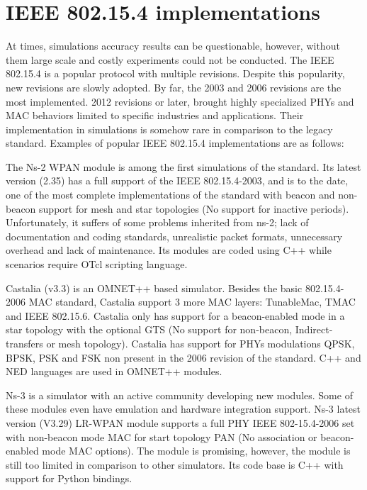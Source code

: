 \documentclass[conference]{IEEEtran}
\begin{document}
\section{IEEE 802.15.4 implementations} \label{implementationStd}
At times, simulations accuracy results can be questionable, however, without them large scale and costly experiments could not be conducted. The IEEE 802.15.4 is a popular protocol with multiple revisions. Despite this popularity, new revisions are slowly adopted. By far, the 2003 and 2006 revisions are the most implemented. 2012 revisions or later, brought highly specialized PHYs and MAC behaviors limited to specific industries and applications. Their implementation in simulations is somehow rare in comparison to the legacy standard. Examples of popular IEEE 802.15.4 implementations are as follows: 

The Ns-2 WPAN  module \cite{ns2implementation} is among the first simulations of the standard. Its latest version (2.35)  has a full support of the IEEE 802.15.4-2003, and is to the date, one of the most complete implementations of the standard with beacon and non-beacon support for mesh and star topologies (No support for inactive periods). Unfortunately, it suffers of some problems inherited from ns-2; lack of documentation and coding standards, unrealistic packet formats, unnecessary overhead and lack of maintenance. Its modules are coded using C++ while scenarios require OTcl scripting language.

 Castalia (v3.3) \cite{castalia} is an OMNET++ based simulator. Besides the basic 802.15.4-2006 MAC standard, Castalia support 3 more MAC layers: TunableMac, TMAC and IEEE 802.15.6. Castalia only has support for a beacon-enabled mode in a star topology with the optional GTS (No support for non-beacon, Indirect-transfers or mesh topology). Castalia has support for PHYs modulations QPSK, BPSK, PSK and FSK non present in the 2006 revision of the standard. C++ and NED languages are used in OMNET++ modules. 
 
  Ns-3 \cite{ns3} is a simulator with an active community developing new modules. Some of these modules even have emulation and hardware integration support. Ns-3 latest version (V3.29) LR-WPAN module supports a full PHY  IEEE 802-15.4-2006 set with non-beacon mode MAC for start topology PAN (No association or beacon-enabled mode MAC options). The module is promising, however, the module is still too limited in comparison to other simulators. Its code base is C++ with support for Python bindings.
\end{document}
